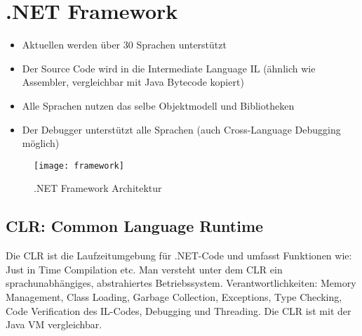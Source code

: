 
\section{.NET Framework}
\begin{itemize}
  \itemsep 0em 
  \item Aktuellen werden über 30 Sprachen unterstützt
  \item Der Source Code wird in die Intermediate Language IL (ähnlich wie Assembler, vergleichbar mit Java Bytecode kopiert)
  \item Alle Sprachen nutzen das selbe Objektmodell und Bibliotheken
  \item Der Debugger unterstützt alle Sprachen (auch Cross-Language Debugging möglich)
\end{itemize}

\begin{figure}[h!]
	\centering
	\texttt{[image: framework]}
    \caption{.NET Framework Architektur}
\end{figure}

\subsection{CLR: Common Language Runtime}
Die CLR ist die Laufzeitumgebung für .NET-Code und umfasst Funktionen wie: Just in Time Compilation etc. Man versteht unter dem CLR ein sprachunabhängiges, abstrahiertes Betriebssystem. Verantwortlichkeiten: Memory Management, Class Loading, Garbage Collection, Exceptions, Type Checking, Code Verification des IL-Codes, Debugging und Threading. Die CLR ist mit der Java VM vergleichbar.


